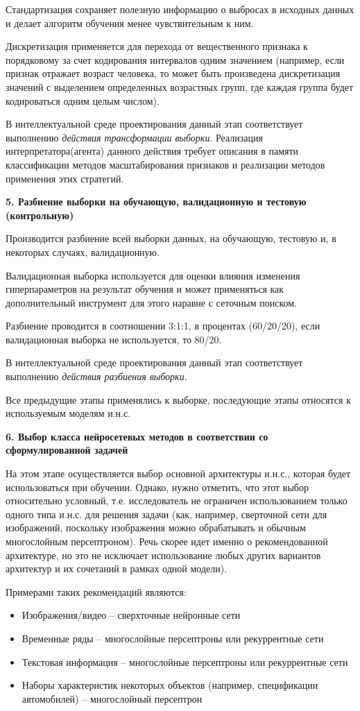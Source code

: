 Стандартизация сохраняет полезную информацию о выбросах в исходных данных и делает алгоритм обучения менее чувствительным к ним.

Дискретизация применяется для перехода от вещественного признака к порядковому за счет кодирования интервалов одним значением (например, если признак отражает возраст человека, то может быть произведена дискретизация значений с выделением определенных возрастных групп, где каждая группа будет кодироваться одним целым числом).

В интеллектуальной среде проектирования данный этап соответствует выполнению \textit{действия трансформации выборки}. Реализация интерпретатора(агента) данного действия требует описания в памяти классификации методов масштабирования признаков и реализации методов применения этих стратегий. 

\textbf{5. Разбиение выборки на обучающую, валидационную и тестовую (контрольную)}

Производится разбиение всей выборки данных, на обучающую, тестовую и, в некоторых случаях, валидационную.

Валидационная выборка используется для оценки влияния изменения гиперпараметров на результат обучения и может применяться как дополнительный инструмент для этого наравне с сеточным поиском.

Разбиение проводится в соотношении 3:1:1, в процентах (60/20/20), если валидационная выборка не используется, то 80/20.

В интеллектуальной среде проектирования данный этап соответствует выполнению \textit{действия разбиения выборки}.

Все предыдущие этапы применялись к выборке, последующие этапы относятся к используемым моделям и.н.с.

\textbf{6. Выбор класса нейросетевых методов в соответствии со сформулированной задачей}

На этом этапе осуществляется выбор основной архитектуры и.н.с., которая будет использоваться при обучении. Однако, нужно отметить, что этот выбор относительно условный, т.е. исследователь не ограничен использованием только одного типа и.н.с. для решения задачи (как, например, сверточной сети для изображений, поскольку изображения можно обрабатывать и обычным многослойным персептроном). Речь скорее идет именно о рекомендованной архитектуре, но это не исключает использование любых других вариантов архитектур и их сочетаний в рамках одной модели).  

Примерами таких рекомендаций являются:
\begin{itemize}
	\item Изображения/видео -- сверхточные нейронные сети
	\item Временные ряды -- многослойные персептроны или рекуррентные сети
	\item Текстовая информация -- многослойные персептроны или рекуррентные сети
	\item Наборы характеристик некоторых объектов (например, спецификации автомобилей) -- многослойный персептрон
\end{itemize}

